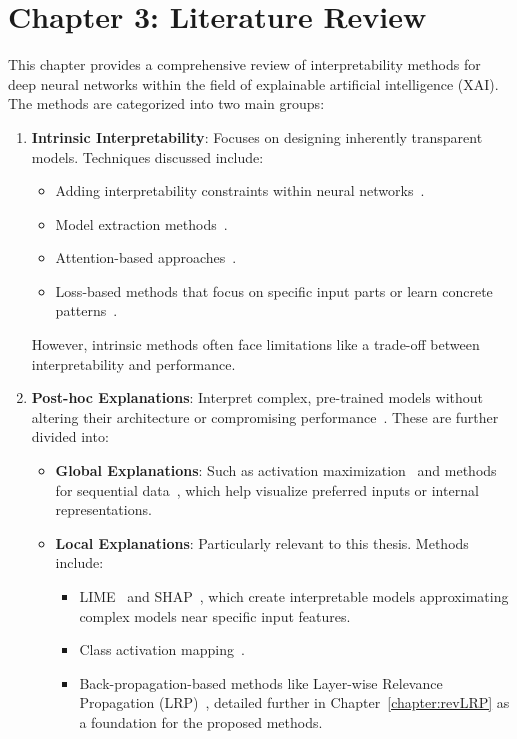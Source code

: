 \section*{Chapter 3: Literature Review}

This chapter provides a comprehensive review of interpretability methods for deep neural networks within the field of explainable artificial intelligence (XAI). The methods are categorized into two main groups:

\begin{enumerate}
    \item \textbf{Intrinsic Interpretability}: Focuses on designing inherently transparent models. Techniques discussed include:
    \begin{itemize}
        \item Adding interpretability constraints within neural networks~\cite{ZhangWZ18a, SabourFH17}.
        \item Model extraction methods~\cite{VandewieleJOTH16, BastaniKB17a}.
        \item Attention-based approaches~\cite{BahdanauCB14, XiaoXYZPZ15}.
        \item Loss-based methods that focus on specific input parts or learn concrete patterns~\cite{ShiXXCLLG21, LinsleySES19}.
    \end{itemize}
    However, intrinsic methods often face limitations like a trade-off between interpretability and performance.

    \item \textbf{Post-hoc Explanations}: Interpret complex, pre-trained models without altering their architecture or compromising performance~\cite{MarkusKR21, AdebayoGMGHK18}. These are further divided into:
    \begin{itemize}
        \item \textbf{Global Explanations}: Such as activation maximization~\cite{SimonyanVZ13, NguyenDYBC16} and methods for sequential data~\cite{KarpathyJL15, KadarCA17}, which help visualize preferred inputs or internal representations.
        \item \textbf{Local Explanations}: Particularly relevant to this thesis. Methods include:
        \begin{itemize}
            \item LIME~\cite{Ribeiro0G16} and SHAP~\cite{LundbergL17}, which create interpretable models approximating complex models near specific input features.
            \item Class activation mapping~\cite{ZhouKLOT16, SelvarajuCDVPB20}.
            \item Back-propagation-based methods like Layer-wise Relevance Propagation (LRP)~\cite{bach2015pixel}, detailed further in Chapter~\ref{chapter:revLRP} as a foundation for the proposed methods.
        \end{itemize}
    \end{itemize}
\end{enumerate}


